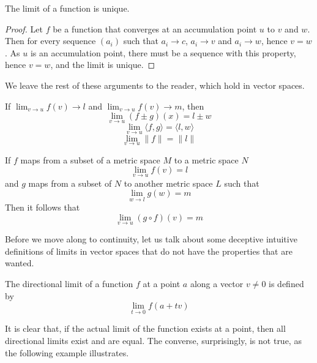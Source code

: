 \begin{corollary}
  The limit of a function is unique.
\end{corollary}
\begin{proof}
  Let $f$ be a function that converges at an accumulation point $u$ to $v$ and $w$. Then for every sequence $(a_i)$ such that $a_i \to c$, $a_i \to v$ and $a_i \to w$, hence $v = w$. As $u$ is an accumulation point, there must be a sequence with this property, hence $v = w$, and the limit is unique.
\end{proof}

We leave the rest of these arguments to the reader, which hold in vector spaces.

\begin{corollary}
  If $\lim_{v \to u} f(v) \to l$ and $\lim_{v \to u} f(v) \to m$, then
  \[ \lim_{v \to u} (f \pm g)(x) = l \pm w \]
  \[ \lim_{v \to u} \langle f, g \rangle = \langle l, w \rangle \]
  \[ \lim_{v \to u} \| f \| = \| l \| \]
\end{corollary}

\begin{corollary}
  If $f$ maps from a subset of a metric space $M$ to a metric space $N$
  \[ \lim_{v \to u} f(v) = l \]
  and $g$ maps from a subset of $N$ to another metric space $L$ such that
  \[ \lim_{w \to l} g(w) = m \]
  Then it follows that
  \[ \lim_{v \to u} (g \circ f)(v) = m \]
\end{corollary}

Before we move along to continuity, let us talk about some deceptive intuitive definitions of limits in vector spaces that do not have the properties that are wanted.

\begin{definition}
  The directional limit of a function $f$ at a point $a$ along a vector $v \neq 0$ is defined by
  \[ \lim_{t \to 0} f(a + tv) \]
\end{definition}

It is clear that, if the actual limit of the function exists at a point, then all directional limits exist and are equal. The converse, surprisingly, is not true, as the following example illustrates.

